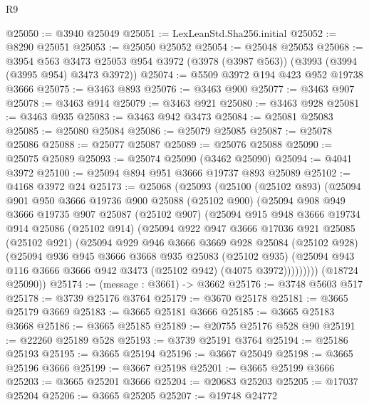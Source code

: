 \begin{lexlean}{R9}
\begin{coremodule}
@25050 := @3940 @25049
@25051 := LexLeanStd.Sha256.initial
@25052 := @8290 @25051
@25053 := @25050 @25052
@25054 := @25048 @25053
@25068 := @3954
    @563
    @3473
    @25053
    @954
    @3972
    (@3978 (@3987 @563))
    (@3993 (@3994 (@3995 @954) @3473 @3972))
@25074 := @5509 @3972 @194 @423 @952 @19738 @3666
@25075 := @3463 @893
@25076 := @3463 @900
@25077 := @3463 @907
@25078 := @3463 @914
@25079 := @3463 @921
@25080 := @3463 @928
@25081 := @3463 @935
@25083 := @3463 @942 @3473
@25084 := @25081 @25083
@25085 := @25080 @25084
@25086 := @25079 @25085
@25087 := @25078 @25086
@25088 := @25077 @25087
@25089 := @25076 @25088
@25090 := @25075 @25089
@25093 := @25074 @25090 (@3462 @25090)
@25094 := @4041 @3972
@25100 := @25094 @894 @951 @3666 @19737 @893 @25089
@25102 := @4168 @3972 @24
@25173 := @25068
    (@25093
      (@25100
        (@25102 @893)
        (@25094
          @901
          @950
          @3666
          @19736
          @900
          @25088
          (@25102 @900)
          (@25094
            @908
            @949
            @3666
            @19735
            @907
            @25087
            (@25102 @907)
            (@25094
              @915
              @948
              @3666
              @19734
              @914
              @25086
              (@25102 @914)
              (@25094
                @922
                @947
                @3666
                @17036
                @921
                @25085
                (@25102 @921)
                (@25094
                  @929
                  @946
                  @3666
                  @3669
                  @928
                  @25084
                  (@25102 @928)
                  (@25094
                    @936
                    @945
                    @3666
                    @3668
                    @935
                    @25083
                    (@25102 @935)
                    (@25094 @943 @116 @3666 @3666 @942 @3473 (@25102 @942) (@4075 @3972)))))))))
      (@18724 @25090))
@25174 := (message : @3661) -> @3662
@25176 := @3748 @5603 @517
@25178 := @3739 @25176 @3764
@25179 := @3670 @25178
@25181 := @3665 @25179 @3669
@25183 := @3665 @25181 @3666
@25185 := @3665 @25183 @3668
@25186 := @3665 @25185
@25189 := @20755 @25176 @528 @90
@25191 := @22260 @25189 @528
@25193 := @3739 @25191 @3764
@25194 := @25186 @25193
@25195 := @3665 @25194
@25196 := @3667 @25049
@25198 := @3665 @25196 @3666
@25199 := @3667 @25198
@25201 := @3665 @25199 @3666
@25203 := @3665 @25201 @3666
@25204 := @20683 @25203
@25205 := @17037 @25204
@25206 := @3665 @25205
@25207 := @19748 @24772

\end{coremodule}
\end{lexlean}
